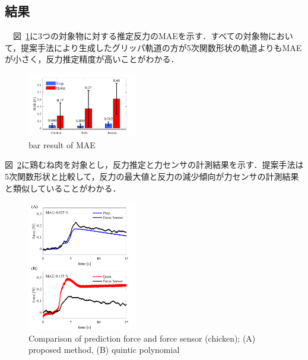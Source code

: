 \documentclass[a4paper]{jarticle}
\begin{document}
\subsection{結果}
　図~\ref{fig:bar_result}に3つの対象物に対する推定反力のMAEを示す．すべての対象物において，提案手法により生成したグリッパ軌道の方が5次関数形状の軌道よりもMAEが小さく，反力推定精度が高いことがわかる．
\begin{figure}[htbp]
    \centering
    \includegraphics[width=0.43\textwidth]{bar_result.pdf}
    \caption{bar result of MAE}  
    \label{fig:bar_result}
\end{figure}
図~\ref{fig:prop_quint}に鶏むね肉を対象とし，反力推定と力センサの計測結果を示す．提案手法は5次関数形状と比較して，反力の最大値と反力の減少傾向が力センサの計測結果と類似していることがわかる．
\begin{figure}[htbp]
    \centering
    \includegraphics[width=0.43\textwidth]{prop_quint.pdf}
    \captionsetup{width=0.9\linewidth} %
    \caption{Comparison of prediction force and force sensor (chicken); (A) proposed method, (B) quintic polynomial}
    \label{fig:prop_quint}
\end{figure}
\end{document}
